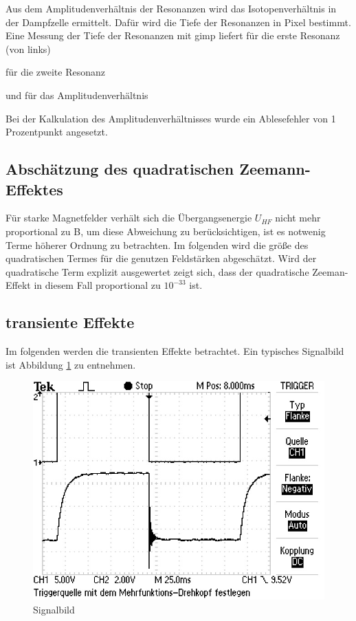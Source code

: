 Aus dem Amplitudenverhältnis der Resonanzen wird das Isotopenverhältnis in der
Dampfzelle ermittelt. Dafür wird die Tiefe der Resonanzen in Pixel bestimmt.
Eine Messung der Tiefe der Resonanzen mit gimp liefert für die erste Resonanz (von links)



für die zweite Resonanz



und für das Amplitudenverhältnis



Bei der Kalkulation des Amplitudenverhältnisses wurde ein Ablesefehler von 1 Prozentpunkt
angesetzt.

\subsection{Abschätzung des quadratischen Zeemann-Effektes}
Für starke Magnetfelder verhält sich die Übergangsenergie $U_{HF}$ nicht mehr proportional zu B, um diese Abweichung zu berücksichtigen, ist es notwenig Terme höherer Ordnung zu betrachten.
Im folgenden wird die größe des quadratischen Termes für die genutzen Feldstärken abgeschätzt. Wird der quadratische Term explizit ausgewertet zeigt sich, dass der quadratische Zeeman-Effekt
in diesem Fall proportional zu $10^{-33}$ ist.

\subsection{transiente Effekte}
Im folgenden werden die transienten Effekte betrachtet. Ein typisches Signalbild ist Abbildung \ref{sigPic} zu entnehmen.

\begin{figure}[h]
\centering
\includegraphics[scale=0.8]{img/TEK0019.JPG}
\caption{Signalbild}
\label{sigPic}
\end{figure}

